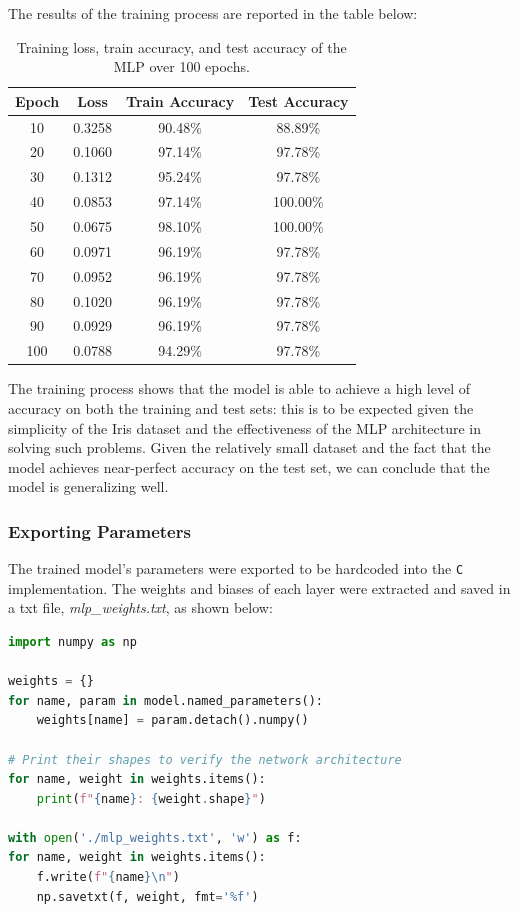 \documentclass{article}
\begin{document}
The results of the training process are reported in the table below:
\begin{table}[H]
    \centering
    \begin{tabular}{|c|c|c|c|}
        \hline
        \textbf{Epoch} & \textbf{Loss} & \textbf{Train Accuracy} & \textbf{Test Accuracy} \\
        \hline
        10 & 0.3258 & 90.48\% & 88.89\% \\
        20 & 0.1060 & 97.14\% & 97.78\% \\
        30 & 0.1312 & 95.24\% & 97.78\% \\
        40 & 0.0853 & 97.14\% & 100.00\% \\
        50 & 0.0675 & 98.10\% & 100.00\% \\
        60 & 0.0971 & 96.19\% & 97.78\% \\
        70 & 0.0952 & 96.19\% & 97.78\% \\
        80 & 0.1020 & 96.19\% & 97.78\% \\
        90 & 0.0929 & 96.19\% & 97.78\% \\
        100 & 0.0788 & 94.29\% & 97.78\% \\
        \hline
    \end{tabular}
    \caption{\centering Training loss, train accuracy, and test accuracy of the MLP over 100 epochs.}
    \label{tab:mlp-training}
\end{table}


The training process shows that the model is able to achieve a high level of accuracy on both the training and test sets: this is to be expected given the simplicity of the Iris dataset and the effectiveness of the MLP architecture in solving such problems.
Given the relatively small dataset and the fact that the model achieves near-perfect accuracy on the test set, we can conclude that the model is generalizing well.

\subsubsection{Exporting Parameters}
The trained model's parameters were exported to be hardcoded into the \texttt{C} implementation. The weights and biases of each layer were extracted and saved in a txt file, \textit{mlp\_weights.txt}, as shown below:
\begin{lstlisting}[language=Python]
import numpy as np

weights = {}
for name, param in model.named_parameters():
    weights[name] = param.detach().numpy()

# Print their shapes to verify the network architecture
for name, weight in weights.items():
    print(f"{name}: {weight.shape}")

with open('./mlp_weights.txt', 'w') as f:
for name, weight in weights.items():
    f.write(f"{name}\n")
    np.savetxt(f, weight, fmt='%f')
\end{lstlisting}
\end{document}
